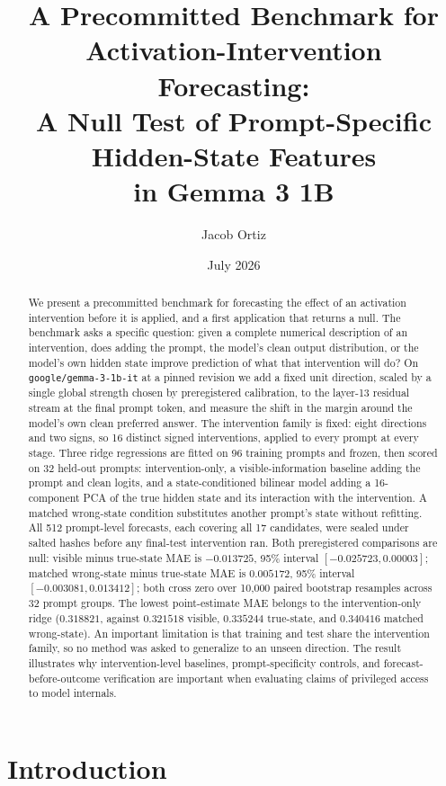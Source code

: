 \documentclass{article}
\title{A Precommitted Benchmark for Activation-Intervention Forecasting:\\
A Null Test of Prompt-Specific Hidden-State Features\\
in Gemma 3 1B}
\author{Jacob Ortiz}
\date{July 2026}
\begin{document}
\maketitle

\begin{abstract}
We present a precommitted benchmark for forecasting the effect of an activation intervention before
it is applied, and a first application that returns a null. The benchmark asks a specific question:
given a complete numerical description of an intervention, does adding the prompt, the model's clean
output distribution, or the model's own hidden state improve prediction of what that intervention
will do? On \texttt{google/gemma-3-1b-it} at a pinned revision we add a fixed unit direction, scaled
by a single global strength chosen by preregistered calibration, to the layer-13 residual stream at
the final prompt token, and measure the shift in the margin around the model's own clean preferred
answer. The intervention family is fixed: eight directions and two signs, so 16 distinct signed
interventions, applied to every prompt at every stage. Three ridge regressions are fitted on 96
training prompts and frozen, then scored on 32 held-out prompts: intervention-only, a
visible-information baseline adding the prompt and clean logits, and a state-conditioned bilinear
model adding a 16-component PCA of the true hidden state and its interaction with the intervention.
A matched wrong-state condition substitutes another prompt's state without refitting. All 512
prompt-level forecasts, each covering all 17 candidates, were sealed under salted hashes before any
final-test intervention ran. Both preregistered comparisons are null: visible minus true-state MAE
is $-0.013725$, 95\% interval $[-0.025723, 0.00003]$; matched wrong-state minus true-state MAE is
$0.005172$, 95\% interval $[-0.003081, 0.013412]$; both cross zero over 10{,}000 paired bootstrap
resamples across 32 prompt groups. The lowest point-estimate MAE belongs to the intervention-only
ridge ($0.318821$, against $0.321518$ visible, $0.335244$ true-state, and $0.340416$ matched
wrong-state). An important limitation is that training and test share the intervention family, so
no method was asked to generalize to an unseen direction. The result illustrates why
intervention-level baselines, prompt-specificity controls, and forecast-before-outcome verification
are important when evaluating claims of privileged access to model internals.
\end{abstract}

\section{Introduction}
\end{document}

